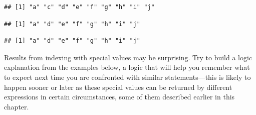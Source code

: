 \documentclass[krantz2]{krantz}\usepackage{knitr}%
\begin{document}
\begin{knitrout}\footnotesize
{}\color{fgcolor}\begin{kframe}
\begin{alltt}
\hlstd{a[}\hlopt{-}\hlstd{]}
\end{alltt}
\begin{verbatim}
## [1] "a" "c" "d" "e" "f" "g" "h" "i" "j"
\end{verbatim}
\begin{alltt}
\hlstd{a[}\hlopt{-}\hlstd{(}\hlstd{,}\hlstd{)]}
\end{alltt}
\begin{verbatim}
## [1] "a" "d" "e" "f" "g" "h" "i" "j"
\end{verbatim}
\begin{alltt}
\hlstd{a[}\hlopt{-}\hlopt{:-}\hlstd{]}
\end{alltt}
\begin{verbatim}
## [1] "a" "d" "e" "f" "g" "h" "i" "j"
\end{verbatim}
\begin{alltt}
\end{alltt}
\end{kframe}
\end{knitrout}

\begin{playground}
Results from indexing with special values may be surprising. Try to build a logic explanation from the examples below, a logic that will help you remember what to expect next time you are confronted with similar statements---this is likely to happen sooner or later as these special values can be returned by different \Rlang expressions in certain circumstances, some of them described earlier in this chapter.

\begin{knitrout}\footnotesize
{}\color{fgcolor}\begin{kframe}
\begin{alltt}
\hlstd{a[}\hlstd{]}
\hlstd{a[}\hlstd{(}\hlstd{)]}
\hlstd{a[}\hlstd{]}
\hlstd{a[}\hlstd{(}\hlstd{,} \hlstd{)]}
\hlstd{a[}\hlstd{]}
\hlstd{a[}\hlstd{(}\hlstd{,} \hlstd{)]}
\end{alltt}
\end{kframe}
\end{knitrout}
\end{playground}
\end{document}
